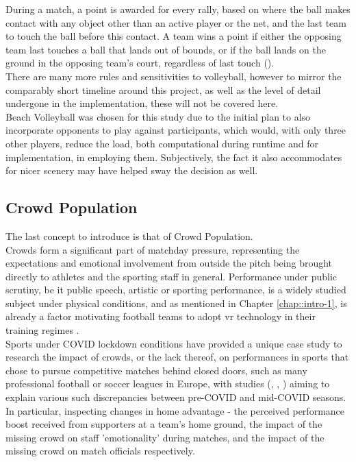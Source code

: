During a match, a point is awarded for every rally, based on where the ball makes contact with any object other than an active player or the net, and the last team to touch the ball before this contact. A team wins a point if either the opposing team last touches a ball that lands out of bounds, or if the ball lands on the ground in the opposing team's court, regardless of last touch (\cite{fivb-2026-volleyball}).\\

There are many more rules and sensitivities to volleyball, however to mirror the comparably short timeline around this project, as well as the level of detail undergone in the implementation, these will not be covered here.\\

Beach Volleyball was chosen for this study due to the initial plan to also incorporate opponents to play against participants, which would, with only three other players, reduce the load, both computational during runtime and for implementation, in employing them. Subjectively, the fact it also accommodates for nicer scenery may have helped sway the decision as well.

\subsection{Crowd Population}

The last concept to introduce is that of Crowd Population.\\
Crowds form a significant part of matchday pressure, representing the expectations and emotional involvement from outside the pitch being brought directly to athletes and the sporting staff in general. Performance under public scrutiny, be it public speech, artistic or sporting performance, is a widely studied subject under physical conditions, and as mentioned in Chapter \ref{chap::intro-1}, is already a factor motivating football teams to adopt \gls{vr} technology in their training regimes \cite{cunningham-2022-half}.\\

Sports under COVID lockdown conditions have provided a unique case study to research the impact of crowds, or the lack thereof, on performances in sports that chose to pursue competitive matches behind closed doors, such as many professional football or soccer leagues in Europe, with studies (\cite{leitner-2023-cauldron}, \cite{leitner-2021-analysis}, \cite{richlan-2023-subjective}) aiming to explain various such discrepancies between pre-COVID and mid-COVID seasons. In particular, inspecting changes in home advantage - the perceived performance boost received from supporters at a team's home ground, the impact of the missing crowd on staff 'emotionality' during matches, and the impact of the missing crowd on match officials respectively.\\

